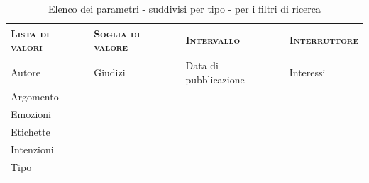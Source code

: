 \begin{table}[ht]
\centering
\begin{tabular}{|l|l|l|l|}
\hline
\textsc{Lista di valori} & \textsc{Soglia di valore} & \textsc{Intervallo} & \textsc{Interruttore}\\ \hline
Autore & Giudizi & Data di pubblicazione & Interessi \\
Argomento & & & \\
Emozioni & & & \\
Etichette & & & \\
Intenzioni & & & \\
Tipo & & & \\ \hline
\end{tabular}
\caption{Elenco dei parametri - suddivisi per tipo - per i filtri di ricerca}
\label{tab:tesi:stage:parametri-filtri-tipo}
\end{table}

